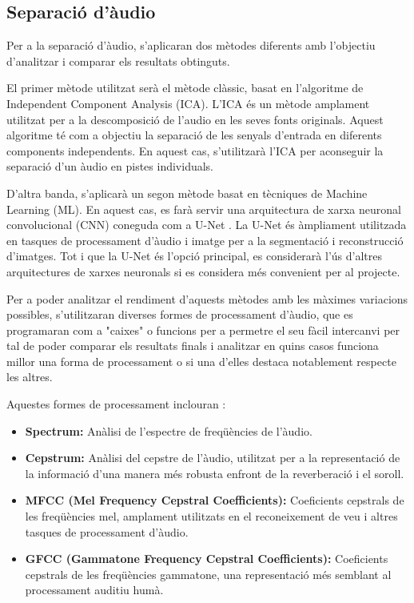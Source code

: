 \documentclass[10pt,a4paper,twocolumn,twoside]{article}
\begin{document}
\subsection{Separació d'àudio}

Per a la separació d'àudio, s'aplicaran dos mètodes diferents amb l'objectiu d'analitzar i comparar els resultats obtinguts.

El primer mètode utilitzat serà el mètode clàssic, basat en l'algoritme de Independent Component Analysis (ICA). L'ICA és un mètode amplament utilitzat per a la descomposició de l'audio en les seves fonts originals. Aquest algoritme té com a objectiu la separació de les senyals d'entrada en diferents components independents. En aquest cas, s'utilitzarà l'ICA per aconseguir la separació d'un àudio en pistes individuals.

D'altra banda, s'aplicarà un segon mètode basat en tècniques de Machine Learning (ML). En aquest cas, es farà servir una arquitectura de xarxa neuronal convolucional (CNN) coneguda com a U-Net \cite{spleeter2020}. La U-Net és àmpliament utilitzada en tasques de processament d'àudio i imatge per a la segmentació i reconstrucció d'imatges. Tot i que la U-Net és l'opció principal, es considerarà l'ús d'altres arquitectures de xarxes neuronals si es considera més convenient per al projecte.

Per a poder analitzar el rendiment d'aquests mètodes amb les màximes variacions possibles, s'utilitzaran diverses formes de processament d'àudio, que es programaran com a "caixes" o funcions per a permetre el seu fàcil intercanvi per tal de poder comparar els resultats finals i analitzar en quins casos funciona millor una forma de processament o si una d'elles destaca notablement respecte les altres. 

Aquestes formes de processament inclouran \cite{audio-processing-ML}:

\begin{itemize}
\item \textbf{Spectrum:} Anàlisi de l'espectre de freqüències de l'àudio.
\item \textbf{Cepstrum:} Anàlisi del cepstre de l'àudio, utilitzat per a la representació de la informació d'una manera més robusta enfront de la reverberació i el soroll.
\item \textbf{MFCC (Mel Frequency Cepstral Coefficients):} Coeficients cepstrals de les freqüències mel, amplament utilitzats en el reconeixement de veu i altres tasques de processament d'àudio.
\item \textbf{GFCC (Gammatone Frequency Cepstral Coefficients):} Coeficients cepstrals de les freqüències gammatone, una representació més semblant al processament auditiu humà.
\end{itemize}
\end{document}
